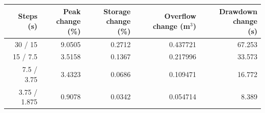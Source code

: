 \begin{tabular}{rrrrr}
\toprule
Steps (s) & \shortstack{Peak change\\(\%)} & \shortstack{Storage change\\(\%)} & \shortstack{Overflow change\\(m$^3$)} & \shortstack{Drawdown change\\(s)} \\
\midrule
30 / 15 & 9.0505 & 0.2712 & 0.437721 & 67.253 \\
15 / 7.5 & 3.5158 & 0.1367 & 0.217996 & 33.573 \\
7.5 / 3.75 & 3.4323 & 0.0686 & 0.109471 & 16.772 \\
3.75 / 1.875 & 0.9078 & 0.0342 & 0.054714 & 8.389 \\
\bottomrule
\end{tabular}
